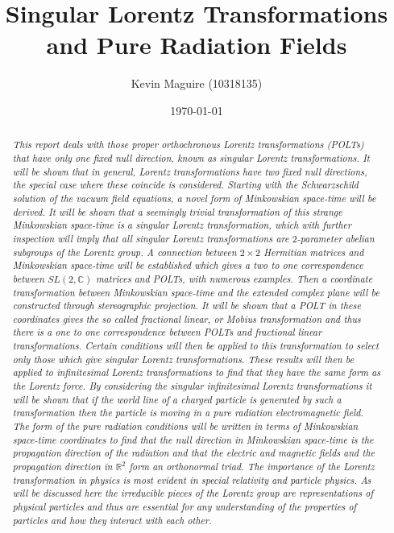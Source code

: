 \documentclass[floatfix,aps,prd,amsmath,amssymb]{revtex4}
\begin{document}
\title{Singular Lorentz Transformations and Pure Radiation Fields}
\author{Kevin Maguire (10318135)}
\date{\today}

\begin{abstract}
\textit{This report deals with those proper orthochronous Lorentz transformations (POLTs) that have only one fixed null direction, known as singular Lorentz transformations. It will be shown that in general, Lorentz transformations have two fixed null directions, the special case where these coincide is considered. Starting with the Schwarzschild solution of the vacuum field equations, a novel form of Minkowskian space-time will be derived. It will be shown that a seemingly trivial transformation of this strange Minkowskian space-time is a singular Lorentz transformation, which with further inspection will imply that all singular Lorentz transformations are $2$-parameter abelian subgroups of the Lorentz group. A connection between $2 \times 2$ Hermitian matrices and Minkowskian space-time will be established which gives a two to one correspondence between $SL(2,\mathbb{C})$ matrices and POLTs, with numerous examples. Then a coordinate transformation between Minkowskian space-time and the extended complex plane will be constructed through stereographic projection. It will be shown that a POLT in these coordinates gives the so called fractional linear, or Mobius transformation and thus there is a one to one correspondence between POLTs and fractional linear transformations. Certain conditions will then be applied to this transformation to select only those which give singular Lorentz transformations. These results will then be applied to infinitesimal Lorentz transformations to find that they have the same form as the Lorentz force. By considering the singular infinitesimal Lorentz transformations it will be shown that if the world line of a charged particle is generated by such a transformation then the particle is moving in a pure radiation electromagnetic field. The form of the pure radiation conditions will be written in terms of Minkowskian space-time coordinates to find that the null direction in Minkowskian space-time is the propagation direction of the radiation and that the electric and magnetic fields and the propagation direction in $\mathbb{R}^2$ form an orthonormal triad. The importance of the Lorentz transformation in physics is most evident in special relativity and particle physics. As will be discussed here the irreducible pieces of the Lorentz group are representations of physical particles and thus are essential for any understanding of the properties of particles and how they interact with each other.}
\end{abstract}
\end{document}
